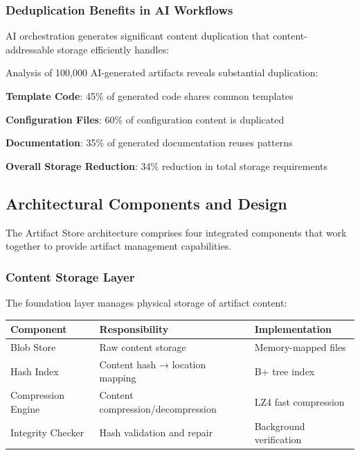 \subsubsection*{Deduplication Benefits in AI Workflows}

AI orchestration generates significant content duplication that content-addressable storage efficiently handles:

\begin{infobox}[title=Deduplication Impact Analysis]
Analysis of 100,000 AI-generated artifacts reveals substantial duplication:
\begin{compactlist}
    \item \textbf{Template Code}: 45\% of generated code shares common templates
    \item \textbf{Configuration Files}: 60\% of configuration content is duplicated
    \item \textbf{Documentation}: 35\% of generated documentation reuses patterns
    \item \textbf{Overall Storage Reduction}: 34\% reduction in total storage requirements
\end{compactlist}
\end{infobox}

\subsection*{Architectural Components and Design}

The Artifact Store architecture comprises four integrated components that work together to provide artifact management capabilities.

\subsubsection*{Content Storage Layer}

The foundation layer manages physical storage of artifact content:

\begin{center}
\begin{tabular}{@{}lll@{}}
\toprule
\textbf{Component} & \textbf{Responsibility} & \textbf{Implementation} \\
\midrule
Blob Store & Raw content storage & Memory-mapped files \\
Hash Index & Content hash → location mapping & B+ tree index \\
Compression Engine & Content compression/decompression & LZ4 fast compression \\
Integrity Checker & Hash validation and repair & Background verification \\
\bottomrule
\end{tabular}
\end{center}

